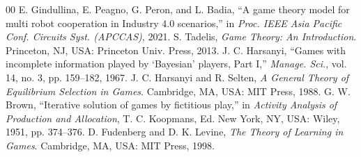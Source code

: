\documentclass[conference]{IEEEtran}
\begin{document}
\begin{thebibliography}{00}
 E. Gindullina, E. Peagno, G. Peron, and L. Badia, ``A game theory model for multi robot cooperation in Industry 4.0 scenarios,'' in \emph{Proc. IEEE Asia Pacific Conf. Circuits Syst. (APCCAS)}, 2021.
 S. Tadelis, \emph{Game Theory: An Introduction}. Princeton, NJ, USA: Princeton Univ. Press, 2013.
 J. C. Harsanyi, ``Games with incomplete information played by `Bayesian' players, Part I,'' \emph{Manage. Sci.}, vol. 14, no. 3, pp. 159--182, 1967.
 J. C. Harsanyi and R. Selten, \emph{A General Theory of Equilibrium Selection in Games}. Cambridge, MA, USA: MIT Press, 1988.
 G. W. Brown, ``Iterative solution of games by fictitious play,'' in \emph{Activity Analysis of Production and Allocation}, T. C. Koopmans, Ed. New York, NY, USA: Wiley, 1951, pp. 374--376.
 D. Fudenberg and D. K. Levine, \emph{The Theory of Learning in Games}. Cambridge, MA, USA: MIT Press, 1998.
\end{thebibliography}
\end{document}
